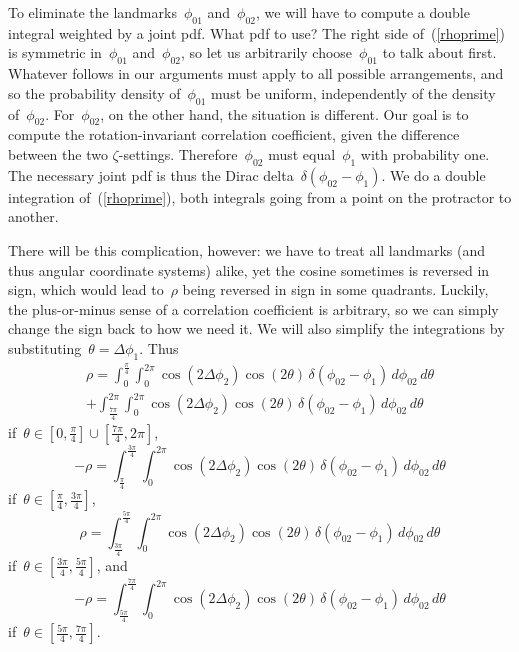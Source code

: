 \documentclass[9pt,technote]{IEEEtran}
\begin{document}
To eliminate the landmarks~$\phi_{01}$ and~$\phi_{02}$, we will have
to compute a double integral weighted by a joint pdf. What pdf to use?
The right side of~(\ref{rhoprime}) is symmetric in~$\phi_{01}$
and~$\phi_{02}$, so let us arbitrarily choose~$\phi_{01}$ to talk
about first. Whatever follows in our arguments must apply to all
possible arrangements, and so the probability density of~$\phi_{01}$
must be uniform, independently of the density
of~$\phi_{02}$. For~$\phi_{02}$, on the other hand, the situation is
different. Our goal is to compute the rotation-invariant correlation
coefficient, given the difference between the two
$\zeta$-settings. Therefore~$\phi_{02}$ must equal~$\phi_{1}$ with
probability one. The necessary joint pdf is thus the Dirac
delta~$\delta(\phi_{02}-\phi_1)$. We do a double integration
of~(\ref{rhoprime}), both integrals going from a point on the
protractor to another.

There will be this complication, however: we have to treat all
landmarks (and thus angular coordinate systems) alike, yet the cosine
sometimes is reversed in sign, which would lead to~$\rho$ being
reversed in sign in some quadrants. Luckily, the plus-or-minus sense
of a correlation coefficient is arbitrary, so we can simply change the
sign back to how we need it. We will also simplify the integrations by
substituting~$\theta=\Delta\phi_1 $. Thus
\begin{multline}
\rho = \int_{0}^{\frac{\pi}{4}}\int_0^{2\pi}\cos(2\Delta\phi_2)\cos(2\theta)\,\delta(\phi_{02}-\phi_1)\,d\phi_{02}\,d\theta \\
+ \int_{\frac{7\pi}{4}}^{2\pi}\int_0^{2\pi}\cos(2\Delta\phi_2)\cos(2\theta)\,\delta(\phi_{02}-\phi_1)\,d\phi_{02}\,d\theta
\end{multline}
if~$\theta\in[0,\frac{\pi}{4}]\cup[\frac{7\pi}{4},2\pi]$,
\begin{equation}
-\rho = \int_{\frac{\pi}{4}}^{\frac{3\pi}{4}}\int_0^{2\pi}\cos(2\Delta\phi_2)\cos(2\theta)\,\delta(\phi_{02}-\phi_1)\,d\phi_{02}\,d\theta
\end{equation}
if~$\theta\in[\frac{\pi}{4},\frac{3\pi}{4}]$,
\begin{equation}
\rho = \int_{\frac{3\pi}{4}}^{\frac{5\pi}{4}}\int_0^{2\pi}\cos(2\Delta\phi_2)\cos(2\theta)\,\delta(\phi_{02}-\phi_1)\,d\phi_{02}\,d\theta
\end{equation}
if~$\theta\in[\frac{3\pi}{4},\frac{5\pi}{4}]$, and
\begin{equation}
-\rho = \int_{\frac{5\pi}{4}}^{\frac{7\pi}{4}}\int_0^{2\pi}\cos(2\Delta\phi_2)\cos(2\theta)\,\delta(\phi_{02}-\phi_1)\,d\phi_{02}\,d\theta
\end{equation}
if~$\theta\in[\frac{5\pi}{4},\frac{7\pi}{4}]$.
\end{document}
